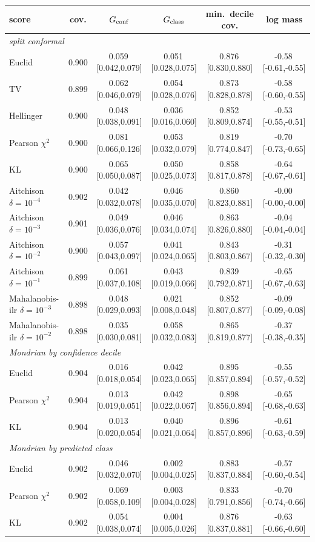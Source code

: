 \begin{tabular}{lccccc}\toprule
score & cov. & $G_{\rm conf}$ & $G_{\rm class}$ & min.\ decile cov. & log mass\\\midrule
\multicolumn{6}{l}{\emph{split conformal}}\\
Euclid & 0.900 & 0.059\,[0.042,0.079] & 0.051\,[0.028,0.075] & 0.876\,[0.830,0.880] & -0.58\,[-0.61,-0.55]\\
TV & 0.899 & 0.062\,[0.046,0.079] & 0.054\,[0.028,0.076] & 0.873\,[0.828,0.878] & -0.58\,[-0.60,-0.55]\\
Hellinger & 0.900 & 0.048\,[0.038,0.091] & 0.036\,[0.016,0.060] & 0.852\,[0.809,0.874] & -0.53\,[-0.55,-0.51]\\
Pearson $\chi^2$ & 0.900 & 0.081\,[0.066,0.126] & 0.053\,[0.032,0.079] & 0.819\,[0.774,0.847] & -0.70\,[-0.73,-0.65]\\
KL & 0.900 & 0.065\,[0.050,0.087] & 0.050\,[0.025,0.073] & 0.858\,[0.817,0.878] & -0.64\,[-0.67,-0.61]\\
Aitchison $\delta{=}10^{-4}$ & 0.902 & 0.042\,[0.032,0.078] & 0.046\,[0.035,0.070] & 0.860\,[0.823,0.881] & -0.00\,[-0.00,-0.00]\\
Aitchison $\delta{=}10^{-3}$ & 0.901 & 0.049\,[0.036,0.076] & 0.046\,[0.034,0.074] & 0.863\,[0.826,0.880] & -0.04\,[-0.04,-0.04]\\
Aitchison $\delta{=}10^{-2}$ & 0.900 & 0.057\,[0.043,0.097] & 0.041\,[0.024,0.065] & 0.843\,[0.803,0.867] & -0.31\,[-0.32,-0.30]\\
Aitchison $\delta{=}10^{-1}$ & 0.899 & 0.061\,[0.037,0.108] & 0.043\,[0.019,0.066] & 0.839\,[0.792,0.871] & -0.65\,[-0.67,-0.63]\\
Mahalanobis-ilr $\delta{=}10^{-3}$ & 0.898 & 0.048\,[0.029,0.093] & 0.021\,[0.008,0.048] & 0.852\,[0.807,0.877] & -0.09\,[-0.09,-0.08]\\
Mahalanobis-ilr $\delta{=}10^{-2}$ & 0.898 & 0.035\,[0.030,0.081] & 0.058\,[0.032,0.083] & 0.865\,[0.819,0.877] & -0.37\,[-0.38,-0.35]\\
\multicolumn{6}{l}{\emph{Mondrian by confidence decile}}\\
Euclid & 0.904 & 0.016\,[0.018,0.054] & 0.042\,[0.023,0.065] & 0.895\,[0.857,0.894] & -0.55\,[-0.57,-0.52]\\
Pearson $\chi^2$ & 0.904 & 0.013\,[0.019,0.051] & 0.042\,[0.022,0.067] & 0.898\,[0.856,0.894] & -0.65\,[-0.68,-0.63]\\
KL & 0.904 & 0.013\,[0.020,0.054] & 0.040\,[0.021,0.064] & 0.896\,[0.857,0.896] & -0.61\,[-0.63,-0.59]\\
\multicolumn{6}{l}{\emph{Mondrian by predicted class}}\\
Euclid & 0.902 & 0.046\,[0.032,0.070] & 0.002\,[0.004,0.025] & 0.883\,[0.837,0.884] & -0.57\,[-0.60,-0.54]\\
Pearson $\chi^2$ & 0.902 & 0.069\,[0.058,0.109] & 0.003\,[0.004,0.028] & 0.833\,[0.791,0.856] & -0.70\,[-0.74,-0.66]\\
KL & 0.902 & 0.054\,[0.038,0.074] & 0.004\,[0.005,0.026] & 0.876\,[0.837,0.881] & -0.63\,[-0.66,-0.60]\\
\bottomrule\end{tabular}
